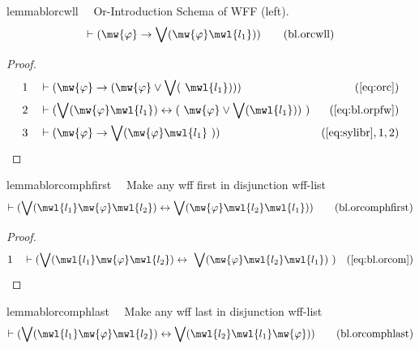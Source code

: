 \begin{restatable}{lemma}{blorcwll}~~ Or-Introduction Schema of WFF (left).
\begin{align}
\vdash ( \mw{\varphi} \rightarrow \bigvee( \mw{\varphi} \mwl{l_1} )
    )\label{eq:bl.orcwll}\tag{bl.orcwll}
\end{align}
\end{restatable}

\begin{proof}
\begin{align}
  1 &&  & \vdash ( \mw{\varphi} \rightarrow ( \mw{\varphi} \vee \bigvee(
     ~\mwl{l_1} ) ) )&(\mbox{\ref{eq:orc}})\notag
  \\ 2 &&  & \vdash ( \bigvee( \mw{\varphi} \mwl{l_1} ) \leftrightarrow (
     ~\mw{\varphi} \vee \bigvee( \mwl{l_1} ) )
     ~)&(\mbox{\ref{eq:bl.orpfw}})\notag
  \\ 3 &&  & \vdash ( \mw{\varphi} \rightarrow \bigvee( \mw{\varphi} \mwl{l_1}
     ~) )&(\mbox{\ref{eq:sylibr}},1,2)\notag
\end{align}
\end{proof}

\begin{restatable}{lemma}{blorcomphfirst}~~ Make any wff first in disjunction
wff-list
\begin{align}
\vdash ( \bigvee( \mwl{l_1} \mw{\varphi} \mwl{l_2} ) \leftrightarrow \bigvee(
    \mw{\varphi} \mwl{l_2} \mwl{l_1} )
    )\label{eq:bl.orcomphfirst}\tag{bl.orcomphfirst}
\end{align}
\end{restatable}

\begin{proof}
\begin{align}
  1 &&  & \vdash ( \bigvee( \mwl{l_1} \mw{\varphi} \mwl{l_2} ) \leftrightarrow
     ~\bigvee( \mw{\varphi} \mwl{l_2} \mwl{l_1} )
     ~)&(\mbox{\ref{eq:bl.orcom}})\notag
\end{align}
\end{proof}

\begin{restatable}{lemma}{blorcomphlast}~~ Make any wff last in disjunction
wff-list
\begin{align}
\vdash ( \bigvee( \mwl{l_1} \mw{\varphi} \mwl{l_2} ) \leftrightarrow \bigvee(
    \mwl{l_2} \mwl{l_1} \mw{\varphi} )
    )\label{eq:bl.orcomphlast}\tag{bl.orcomphlast}
\end{align}
\end{restatable}

